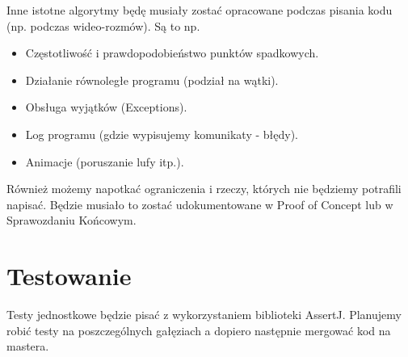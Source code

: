 \documentclass{article}
\begin{document}
Inne istotne algorytmy będę musiały zostać opracowane podczas pisania kodu (np. podczas wideo-rozmów). 
Są to np. 
\begin{itemize}
    \item Częstotliwość i prawdopodobieństwo punktów spadkowych.
    \item Działanie równoległe programu (podział na wątki).
    \item Obsługa wyjątków (Exceptions).
    \item Log programu (gdzie wypisujemy komunikaty - błędy).
    \item Animacje (poruszanie lufy itp.).
\end{itemize}

Również możemy napotkać ograniczenia i rzeczy, których nie będziemy potrafili napisać. Będzie musiało to zostać udokumentowane w Proof of Concept lub w Sprawozdaniu Końcowym.

\section{Testowanie}
Testy jednostkowe będzie pisać z wykorzystaniem biblioteki AssertJ.
Planujemy robić testy na poszczególnych gałęziach a dopiero następnie mergować kod na mastera.
\end{document}
